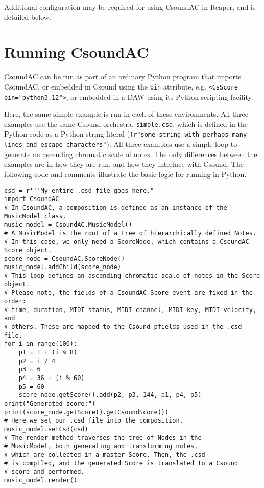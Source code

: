 \documentclass[letterpaper,10pt,DIV=12]{scrartcl}
\begin{document}
Additional configuration may be required for using CsoundAC in Reaper, and is detailed below.

\section{Running CsoundAC}

CsoundAC can be run as part of an ordinary Python program that imports CsoundAC, or embedded in Csound using the \texttt{bin} attribute, e.g. \lstinline|<CsScore bin="python3.12">|, or embedded in a DAW using its Python scripting facility. 

Here, the same simple example is run in each of these environments. All three examples use the same Csound orchestra, \lstinline|simple.csd|, which is defined in the Python code as a Python string literal (\lstinline|(r"some string with perhaps many lines and escape characters"|). All three examples use a simple loop to generate an ascending chromatic scale of notes. The only differences between the examples are in how they are run, and how they interface with Csound. The following code and comments illustrate the basic logic for running in Python.

\begin{lstlisting}[basicstyle=\small\ttfamily]
csd = r'''My entire .csd file goes here."
import CsoundAC
# In CsoundAC, a composition is defined as an instance of the MusicModel class.
music_model = CsoundAC.MusicModel()
# A MusicModel is the root of a tree of hierarchically defined Notes.
# In this case, we only need a ScoreNode, which contains a CsoundAC Score object.
score_node = CsoundAC.ScoreNode()
music_model.addChild(score_node)
# This loop defines an ascending chromatic scale of notes in the Score object.
# Please note, the fields of a CsoundAC Score event are fixed in the order:
# time, duration, MIDI status, MIDI channel, MIDI key, MIDI velocity, and 
# others. These are mapped to the Csound pfields used in the .csd file.
for i in range(100):
    p1 = 1 + (i % 8)
    p2 = i / 4
    p3 = 6
    p4 = 36 + (i % 60)
    p5 = 60
    score_node.getScore().add(p2, p3, 144, p1, p4, p5)
print("Generated score:")
print(score_node.getScore().getCsoundScore())
# Here we set our .csd file into the composition.
music_model.setCsd(csd)
# The render method traverses the tree of Nodes in the 
# MusicModel, both generating and transforming notes, 
# which are collected in a master Score. Then, the .csd 
# is compiled, and the generated Score is translated to a Csound 
# score and performed.
music_model.render()
\end{lstlisting}
\end{document}
